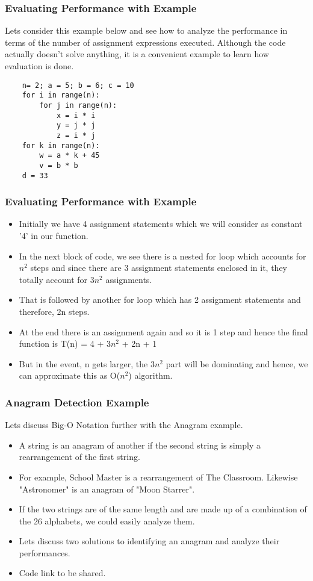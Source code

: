 \documentclass{beamer}
\begin{document}
\begin{frame}[fragile]
\frametitle{Evaluating Performance with Example}
Lets consider this example below and see how to analyze the performance in terms of the number of assignment expressions executed.
Although the code actually doesn't solve anything, it is a convenient example to learn how evaluation is done.
\begin{lstlisting}
    n= 2; a = 5; b = 6; c = 10
    for i in range(n):
        for j in range(n):
            x = i * i
            y = j * j
            z = i * j
    for k in range(n):
        w = a * k + 45
        v = b * b
    d = 33
\end{lstlisting}
\end{frame}

\begin{frame}[fragile]
\frametitle{Evaluating Performance with Example}
\begin{itemize}
\item Initially we have 4 assignment statements which we will consider as constant '4' in our function.
\item In the next block of code, we see there is a nested for loop which accounts for $n^2$ steps and since there are 3 assignment statements enclosed in it, they totally account for 3$n^2$ assignments.
\item That is followed by another for loop which has 2 assignment statements and therefore, 2n steps.
\item At the end there is an assignment again and so it is 1 step and hence the final function is  
T(n) = 4 + 3$n^2$ + 2n + 1
\item But in the event, n gets larger, the 3$n^2$ part will be dominating and hence, we can approximate this as O($n^2$) algorithm.
\end{itemize}
\end{frame}

\begin{frame}[fragile]
\frametitle{Anagram Detection Example}
Lets discuss Big-O Notation further with the Anagram example.
\begin{itemize}
\item A string is an anagram of another if the second string is simply a rearrangement of the first string.
\item For example, School Master is a rearrangement of The Classroom. Likewise "Astronomer" is an anagram of "Moon Starrer".
\item If the two strings are of  the same length and are made up of a combination of the 26 alphabets, we could easily analyze them.
\item Lets discuss two solutions to identifying an anagram and analyze their performances.
\item Code link to be shared.
\end{itemize}
\end{frame}
\end{document}
